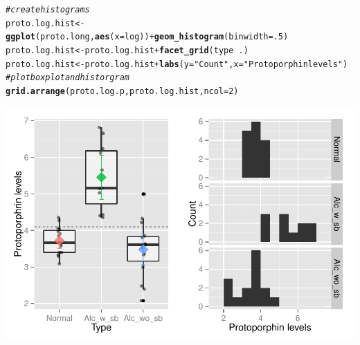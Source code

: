 \documentclass{article}\usepackage[]{graphicx}\usepackage[]{color}
\makeatletter
\def\maxwidth{ %
  \ifdim\Gin@nat@width>\linewidth
    \linewidth
  \else
    \Gin@nat@width
  \fi
}
\newcommand{\hlnum}[1]{\textcolor[rgb]{0.686,0.059,0.569}{#1}}%
\newcommand{\hlstr}[1]{\textcolor[rgb]{0.192,0.494,0.8}{#1}}%
\newcommand{\hlcom}[1]{\textcolor[rgb]{0.678,0.584,0.686}{\textit{#1}}}%
\newcommand{\hlopt}[1]{\textcolor[rgb]{0,0,0}{#1}}%
\newcommand{\hlstd}[1]{\textcolor[rgb]{0.345,0.345,0.345}{#1}}%
\newcommand{\hlkwb}[1]{\textcolor[rgb]{0.69,0.353,0.396}{#1}}%
\newcommand{\hlkwc}[1]{\textcolor[rgb]{0.333,0.667,0.333}{#1}}%
\newcommand{\hlkwd}[1]{\textcolor[rgb]{0.737,0.353,0.396}{\textbf{#1}}}%
\newenvironment{kframe}{%
 \def\at@end@of@kframe{}%
 \ifinner\ifhmode%
  \def\at@end@of@kframe{\end{minipage}}%
  \begin{minipage}{\columnwidth}%
 \fi\fi%
 \def\FrameCommand##1{\hskip\@totalleftmargin \hskip-\fboxsep
 \colorbox{shadecolor}{##1}\hskip-\fboxsep
     \hskip-\linewidth \hskip-\@totalleftmargin \hskip\columnwidth}%
 \MakeFramed {\advance\hsize-\width
   \@totalleftmargin\z@ \linewidth\hsize
   \@setminipage}}%
 {\par\unskip\endMakeFramed%
 \at@end@of@kframe}
\newenvironment{knitrout}{}{} %
\makeatother
\begin{document}
\begin{knitrout}
\begin{kframe}
\begin{alltt}
\hlcom{# create histograms}
\hlstd{proto.log.hist} \hlkwb{<-} \hlkwd{ggplot}\hlstd{(proto.long,} \hlkwd{aes}\hlstd{(}\hlkwc{x} \hlstd{= log))} \hlopt{+} \hlkwd{geom_histogram}\hlstd{(}\hlkwc{binwidth} \hlstd{=} \hlnum{.5}\hlstd{)}
\hlstd{proto.log.hist} \hlkwb{<-} \hlstd{proto.log.hist} \hlopt{+} \hlkwd{facet_grid}\hlstd{(type} \hlopt{~} \hlstd{.)}
\hlstd{proto.log.hist} \hlkwb{<-} \hlstd{proto.log.hist} \hlopt{+} \hlkwd{labs}\hlstd{(}\hlkwc{y} \hlstd{=} \hlstr{"Count"}\hlstd{,} \hlkwc{x} \hlstd{=} \hlstr{"Protoporphin levels"}\hlstd{)}
\hlcom{# plot boxplot and historgram}
\hlkwd{grid.arrange}\hlstd{(proto.log.p, proto.log.hist,} \hlkwc{ncol} \hlstd{=} \hlnum{2}\hlstd{)}
\end{alltt}
\end{kframe}

{\centering \includegraphics[width=\maxwidth]{figure/4_a_plot_log-1} 

}



\end{knitrout}
\end{document}
